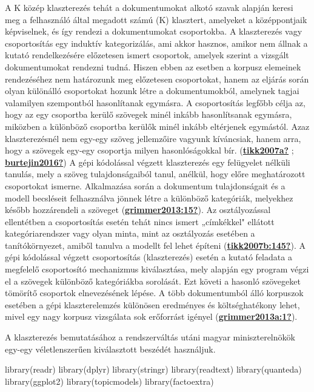 \documentclass[
]{book}
\newenvironment{Shaded}{\begin{snugshade}}{\end{snugshade}}
\newcommand{\FunctionTok}[1]{\textcolor[rgb]{0.00,0.00,0.00}{#1}}
\newcommand{\NormalTok}[1]{#1}
\begin{document}
A K közép klaszterezés tehát a dokumentumokat alkotó szavak alapján
keresi meg a felhasználó által megadott számú (K) klasztert, amelyeket a
középpontjaik képviselnek, és így rendezi a dokumentumokat csoportokba.
A klaszterezés vagy csoportosítás egy induktív kategorizálás, ami akkor
hasznos, amikor nem állnak a kutató rendelkezésére előzetesen ismert
csoportok, amelyek szerint a vizsgált dokumentumokat rendezni tudná.
Hiszen ebben az esetben a korpusz elemeinek rendezéséhez nem határozunk
meg előzetesen csoportokat, hanem az eljárás során olyan különálló
csoportokat hozunk létre a dokumentumokból, amelynek tagjai valamilyen
szempontból hasonlítanak egymásra. A csoportosítás legfőbb célja az,
hogy az egy csoportba kerülő szövegek minél inkább hasonlítsanak
egymásra, miközben a különböző csoportba kerülők minél inkább eltérjenek
egymástól. Azaz klaszterezésnél nem egy-egy szöveg jellemzőire vagyunk
kíváncsiak, hanem arra, hogy a szövegek egy-egy csoportja milyen
hasonlóságokkal bír.
(\protect\hyperlink{ref-tikk2007a}{\textbf{tikk2007a?}} ;
\protect\hyperlink{ref-burtejin2016}{\textbf{burtejin2016?}}) A gépi
kódolással végzett klaszterezés egy felügyelet nélküli tanulás, mely a
szöveg tulajdonságaiból tanul, anélkül, hogy előre meghatározott
csoportokat ismerne. Alkalmazása során a dokumentum tulajdonságait és a
modell becsléseit felhasználva jönnek létre a különböző kategóriák,
melyekhez később hozzárendeli a szöveget
(\protect\hyperlink{ref-grimmer2013:15}{\textbf{grimmer2013:15?}}). Az
osztályozással ellentétben a csoportosítás esetén tehát nincs ismert
„címkékkel" ellátott kategóriarendszer vagy olyan minta, mint az
osztályozás esetében a tanítókörnyezet, amiből tanulva a modellt fel
lehet építeni
(\protect\hyperlink{ref-tikk2007b:145}{\textbf{tikk2007b:145?}}). A gépi
kódolással végzett csoportosítás (klaszterezés) esetén a kutató feladata
a megfelelő csoportosító mechanizmus kiválasztása, mely alapján egy
program végzi el a szövegek különböző kategóriákba sorolását. Ezt követi
a hasonló szövegeket tömörítő csoportok elnevezésének lépése. A több
dokumentumból álló korpuszok esetében a gépi klaszterelemzés különösen
eredményes és költséghatékony lehet, mivel egy nagy korpusz vizsgálata
sok erőforrást igényel
(\protect\hyperlink{ref-grimmer2013a:1}{\textbf{grimmer2013a:1?}}).

A klaszterezés bemutatásához a rendszerváltás utáni magyar
miniszterelnökök egy-egy véletlenszerűen kiválasztott beszédét
használjuk.

\begin{Shaded}
\begin{Highlighting}[]

\FunctionTok{library}\NormalTok{(readr)}
\FunctionTok{library}\NormalTok{(dplyr)}
\FunctionTok{library}\NormalTok{(stringr)}
\FunctionTok{library}\NormalTok{(readtext)}
\FunctionTok{library}\NormalTok{(quanteda)}
\FunctionTok{library}\NormalTok{(ggplot2)}
\FunctionTok{library}\NormalTok{(topicmodels)}
\FunctionTok{library}\NormalTok{(factoextra)}
\end{Highlighting}
\end{Shaded}
\end{document}
